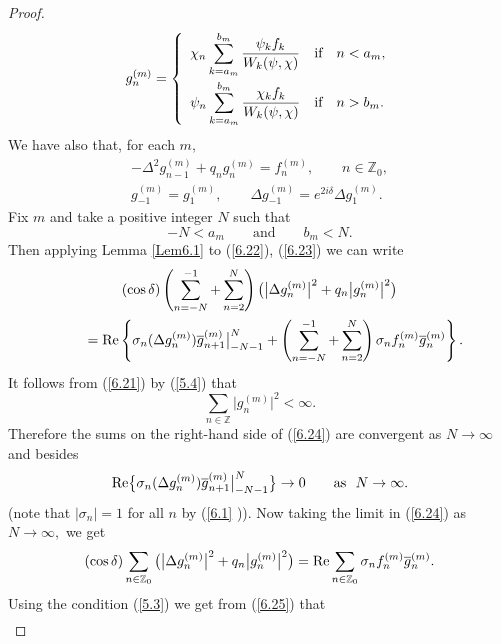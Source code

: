 \begin{proof}
\begin{gather}
g_{n}^{(m)}=\left\{
\begin{array}{lll}
\displaystyle \chi _{n}\sum_{k=a_{m}}^{b_{m}}\frac{\psi _{k}f_{k}}{W_{k}(\psi ,\chi )} &
\text{if} & n<a_{m}, \vspace{1mm}\\
\displaystyle \psi _{n}\sum_{k=a_{m}}^{b_{m}}\frac{\chi _{k}f_{k}}{W_{k}(\psi ,\chi )} &
\text{if} & n>b_{m}.%
\end{array}%
\right.  \label{6.21}
\end{gather}%
We have also that, for each $m,$%
\begin{gather}
-\Delta ^{2}g_{n-1}^{(m)}+q_{n}g_{n}^{(m)}=f_{n}^{(m)},\qquad n\in
\mathbb{Z}
_{0},  \label{6.22}
\\
g_{-1}^{(m)}=g_{1}^{(m)},\qquad \Delta g_{-1}^{(m)}=e^{2i\delta }\Delta
g_{1}^{(m)}.  \label{6.23}
\end{gather}%
Fix $m$ and take a positive integer $N$ such that%
\[
-N<a_{m}\qquad \text{and} \qquad b_{m}<N.
\]%
Then applying Lemma \ref{Lem6.1} to (\ref{6.22}), (\ref{6.23}) we can write%
\begin{gather}
(\cos \delta )\left( \sum_{n=-N}^{-1}+\sum_{n=2}^{N}\right) \big(
\big\vert \Delta g_{n}^{(m)}\big\vert ^{2}+q_{n}\big\vert
g_{n}^{(m)}\big\vert ^{2}\big)  \nonumber \\
\qquad {}= {\rm Re}\left\{ \sigma _{n}(\Delta g_{n}^{(m)})\overline{g}%
_{n+1}^{(m)}\big| _{-N-1}^{N}+\left( \sum_{n=-N}^{-1}+\sum_{n=2}^{N}\right)
\sigma _{n}f_{n}^{(m)}\overline{g}_{n}^{(m)}\right\} .  \label{6.24}
\end{gather}%
It follows from (\ref{6.21}) by (\ref{5.4}) that%
\[
\sum_{n\in
\mathbb{Z}
}\big\vert g_{n}^{(m)}\big\vert ^{2}<\infty.
\]
Therefore the sums on the right-hand side of (\ref{6.24}) are convergent as $%
N\rightarrow \infty $ and besides%
\[
{\rm Re}\big\{ \sigma _{n}(\Delta g_{n}^{(m)})\overline{g}_{n+1}^{(m)}\big|
_{-N-1}^{N}\big\} \rightarrow 0\qquad \text{as} \ \  N\rightarrow \infty .
\]%
(note that $\left\vert \sigma _{n}\right\vert =1$ for all $n$ by (\ref{6.1}%
)). Now taking the limit in (\ref{6.24}) as $N\rightarrow \infty ,$ we get%
\begin{equation}
(\cos \delta )\sum_{n\in
\mathbb{Z}
_{0}}\big( \big\vert \Delta g_{n}^{(m)}\big\vert ^{2}+q_{n}\big\vert
g_{n}^{(m)}\big\vert ^{2}\big) ={\rm Re}\sum_{n\in
\mathbb{Z}
_{0}}\sigma _{n}f_{n}^{(m)}\overline{g}_{n}^{(m)}.  \label{6.25}
\end{equation}%
Using the condition (\ref{5.3}) we get from (\ref{6.25}) that%
\begin{gather*}

\end{gather*}
\end{proof}
